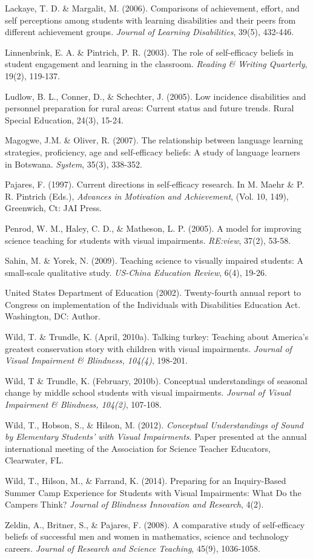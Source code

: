 \documentclass[11.5pt]{sig-alternate} %
\begin{document}
Lackaye, T. D. \& Margalit, M.  (2006).  Comparisons of achievement, effort, and self perceptions among students with learning disabilities and their peers from different achievement groups.  \textit{Journal of Learning Disabilities}, 39(5), 432-446.
 
Linnenbrink, E. A. \& Pintrich, P. R.  (2003).  The role of self-efficacy beliefs in student engagement and learning in the classroom.  \textit{Reading \& Writing Quarterly}, 19(2), 119-137.

Ludlow, B. L., Conner, D., \& Schechter, J.  (2005).  Low incidence disabilities and personnel preparation for rural areas: Current status and future trends.  Rural Special Education, 24(3), 15-24.

Magogwe, J.M. \& Oliver, R.  (2007).  The relationship between language learning strategies, proficiency, age and self-efficacy beliefs: A study of language learners in Botswana. \textit{System}, 35(3), 338-352.

Pajares, F.  (1997).  Current directions in self-efficacy research.  In M. Maehr \& P. R.	Pintrich (Eds.), \textit{Advances in Motivation and Achievement}, (Vol. 10, 149), Greenwich, Ct: JAI Press.

Penrod, W. M., Haley, C. D., \& Matheson, L. P. (2005). A model for improving science teaching for students with visual impairments.  \textit{RE:view}, 37(2), 53-58.

Sahin, M. \& Yorek, N.  (2009).  Teaching science to visually impaired students: A small-scale qualitative study. \textit{US-China Education Review}, 6(4), 19-26.

United States Department of Education (2002).  Twenty-fourth annual report to Congress on implementation of the Individuals with Disabilities Education Act.  Washington, DC: Author.

Wild, T. \& Trundle, K. (April, 2010a).  Talking turkey: Teaching about America’s greatest conservation story with children with visual impairments.  \textit{Journal of Visual Impairment \& Blindness, 104(4)}, 198-201.

Wild, T \& Trundle, K. (February, 2010b).  Conceptual understandings of seasonal change by middle school students with visual impairments. \textit{Journal of Visual Impairment \& Blindness, 104(2)}, 107-108.

Wild, T., Hobson, S., \& Hilson, M.  (2012).  \textit{Conceptual Understandings of Sound by Elementary Students’ with Visual Impairments}.  Paper presented at the annual international meeting of the Association for Science Teacher Educators, Clearwater, FL.
 
Wild, T., Hilson, M., \& Farrand, K. (2014). Preparing for an Inquiry-Based Summer Camp Experience for Students with Visual Impairments: What Do the Campers Think? \textit{Journal of Blindness Innovation and Research}, 4(2).

Zeldin, A., Britner, S., \& Pajares, F. (2008).  A comparative study of self-efficacy beliefs of successful men and women in mathematics, science and technology careers. \textit{Journal of Research and Science Teaching}, 45(9), 1036-1058.
\end{document}
